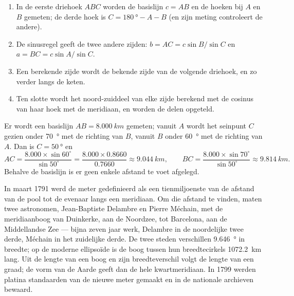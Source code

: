 \begin{method}\label{met:g10:measuring-the-earth:chain}
\begin{enumerate}
  \item In de eerste driehoek $ABC$ worden de basislijn $c = AB$ en de hoeken
        bij $A$ en $B$ gemeten; de derde hoek is
        $C = \qty{180}{\degree} - A - B$ (en zijn meting controleert de
        andere).
  \item De sinusregel geeft de twee andere zijden:
        $b = AC = c \sin B / \sin C$ en $a = BC = c \sin A / \sin C$.
  \item Een berekende zijde wordt de bekende zijde van de volgende driehoek,
        en zo verder langs de keten.
  \item Ten slotte wordt het noord-zuiddeel van elke zijde berekend met de
        cosinus van haar hoek met de meridiaan, en worden de delen opgeteld.
\end{enumerate}
\end{method}

\begin{example}\label{ex:g10:measuring-the-earth:triangle}
Er wordt een basislijn $AB = \qty{8.000}{km}$ gemeten; vanuit $A$ wordt het
seinpunt $C$ gezien onder \qty{70}{\degree} met de richting van $B$, vanuit $B$
onder \qty{60}{\degree} met de richting van $A$. Dan is $C = \qty{50}{\degree}$ en
\[
  AC = \frac{8.000 \times \sin 60^\circ}{\sin 50^\circ} = \frac{8.000 \times 0.8660}{0.7660}
  \approx \qty{9.044}{km}, \qquad
  BC = \frac{8.000 \times \sin 70^\circ}{\sin 50^\circ} \approx \qty{9.814}{km}.
\]
Behalve de basislijn is er geen enkele afstand te voet afgelegd.
\end{example}

\begin{example}\label{ex:g10:measuring-the-earth:meridian}
In maart 1791 werd de meter gedefinieerd als een tienmiljoenste van de afstand
van de pool tot de evenaar langs een meridiaan. Om die afstand te vinden, maten
twee astronomen, Jean-Baptiste Delambre en Pierre Méchain, met  de
meridiaanboog van Duinkerke, aan de Noordzee, tot Barcelona, aan de
Middellandse Zee --- bijna zeven jaar werk, Delambre in de noordelijke twee
derde, Méchain in het zuidelijke derde. De twee steden verschillen
\qty{9.646}{\degree} in breedte; op de moderne ellipsoïde is de boog tussen
hun breedtecirkels \qty{1072.2}{km} lang. Uit de lengte van een boog en zijn
breedteverschil volgt de lengte van een graad; de vorm van de Aarde geeft dan
de hele kwartmeridiaan. In 1799 werden platina standaarden van de nieuwe meter
gemaakt en in de nationale archieven bewaard.
\end{example}

